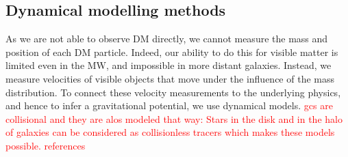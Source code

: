 \subsection{Dynamical modelling methods}
As we are not able to observe \ac{DM} directly, we cannot measure the mass and position of each \ac{DM} particle. Indeed, our ability to do this for visible matter is limited even in the \ac{MW}, and impossible in more distant galaxies. Instead, we measure velocities of visible objects that move under the influence of the mass distribution. To connect these velocity measurements to the underlying physics, and hence to infer a gravitational potential, we use dynamical models. \textcolor{red}{gcs are collisional and they are alos modeled that way: Stars in the disk and in the halo of galaxies can be considered as collisionless tracers which makes these models possible.} \textcolor{red}{references}
